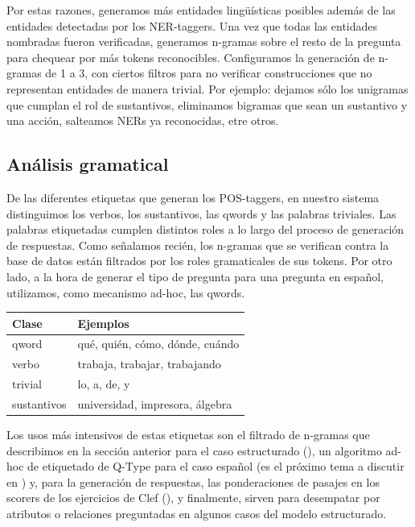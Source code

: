 Por estas razones, generamos más entidades lingüísticas posibles además de las entidades detectadas por los NER-taggers. Una vez que todas las entidades nombradas fueron verificadas, generamos n-gramas sobre el resto de la pregunta para chequear por más tokens reconocibles. Configuramos la generación de n-gramas de 1 a 3, con ciertos filtros para no verificar construcciones que no representan entidades de manera trivial. Por ejemplo: dejamos sólo los unigramas que cumplan el rol de sustantivos, eliminamos bigramas que sean un sustantivo y una acción, salteamos NERs ya reconocidas, etre otros.


\subsection{Análisis gramatical}

De las diferentes etiquetas que generan los POS-taggers, en nuestro sistema distinguimos los verbos, los sustantivos, las qwords y las palabras triviales. 
Las palabras etiquetadas cumplen distintos roles a lo largo del proceso de generación de respuestas. Como señalamos recién, los n-gramas que se verifican contra la base de datos están filtrados por los roles gramaticales de sus tokens. Por otro lado, a la hora de generar el tipo de pregunta para una pregunta en español, utilizamos, como mecanismo ad-hoc, las qwords. 

\begin{center}
\begin{tabular}{| l | l |}
\hline
Clase & Ejemplos\\ \hline
qword  & qué, quién, cómo, dónde, cuándo\\ \hline
verbo & trabaja, trabajar, trabajando \\ \hline
trivial  & lo, a, de, y \\ \hline
sustantivos  & universidad, impresora, álgebra \\ \hline
\end{tabular}
\end{center}

Los usos más intensivos de estas etiquetas son el filtrado de n-gramas que describimos en la sección anterior para el caso estructurado (), un algoritmo ad-hoc de etiquetado de Q-Type para el caso español (es el próximo tema a discutir en ) y, para la generación de respuestas, las ponderaciones de pasajes en los scorers de los ejercicios de Clef (), y finalmente, sirven para desempatar por atributos o relaciones preguntadas en algunos casos del modelo estructurado.

